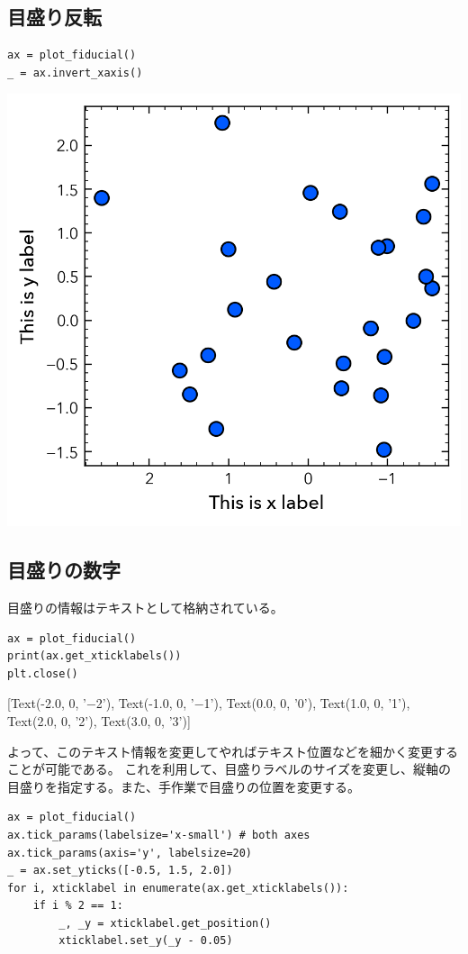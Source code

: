 \documentclass[a4paper, 10pt, notitlepage, twocolumn, uplatex, oneside, dvipdfmx]{jsarticle}
\begin{document}
\subsection{目盛り反転}
\label{sec:org2daefc5}
\begin{verbatim}
ax = plot_fiducial()
_ = ax.invert_xaxis()
\end{verbatim}

\begin{center}
\includegraphics[width=1.0\linewidth]{./obipy-resources/params_tick_inverse.png}
\end{center}
\subsection{目盛りの数字}
\label{sec:orgd15c10c}
目盛りの情報はテキストとして格納されている。
\begin{verbatim}
ax = plot_fiducial()
print(ax.get_xticklabels())
plt.close()
\end{verbatim}

\label{}
{[}Text(-2.0, 0, '−2'), Text(-1.0, 0, '−1'), Text(0.0, 0, '0'), Text(1.0, 0, '1'), Text(2.0, 0, '2'), Text(3.0, 0, '3')]

よって、このテキスト情報を変更してやればテキスト位置などを細かく変更することが可能である。
これを利用して、目盛りラベルのサイズを変更し、縦軸の目盛りを指定する。また、手作業で目盛りの位置を変更する。
\begin{verbatim}
ax = plot_fiducial()
ax.tick_params(labelsize='x-small') # both axes
ax.tick_params(axis='y', labelsize=20)
_ = ax.set_yticks([-0.5, 1.5, 2.0])
for i, xticklabel in enumerate(ax.get_xticklabels()):
    if i % 2 == 1:
        _, _y = xticklabel.get_position()
        xticklabel.set_y(_y - 0.05)
\end{verbatim}
\end{document}
